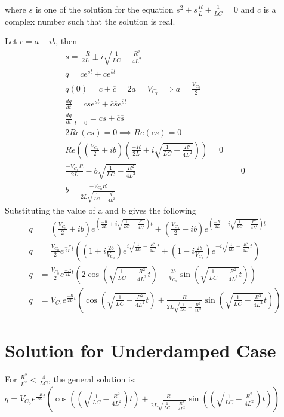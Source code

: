 \documentclass[12pt]{article}
\providecommand{\brak}[1]{\ensuremath{\left(#1\right)}}
\begin{document}
where $s$ is one of the solution for the equation $s^2 + s\frac{R}{L} + \frac{1}{LC} = 0$ and $c$ is a complex number such that the solution is real.\newline

Let $c = a+ib$, then
\begin{align*}
  s = \frac{-R}{2L} \pm i \sqrt{\frac{1}{LC} - \frac{R^2}{4L^2}}\\
  q = c e^{st} + \overline{c} e^{\overline{s}t}\\
  q(0) = c + \overline{c} = 2 a = V_{C_0} \implies a = \frac{V_{C_0}}{2}\\
  \frac{dq}{dt} = cs e^{st} + \overline{c} \overline{s} e^{\overline{s}t}\\
  \frac{dq}{dt}\Bigr|_{t=0} = cs + \overline{c} \overline{s}\\
  2 Re(cs) = 0 \implies Re(cs) = 0 \\
  Re((\frac{V_{C_0}}{2} + ib) ( \frac{-R}{2L} + i \sqrt{\frac{1}{LC} - \frac{R^2}{4L^2}} )) = 0\\
  \frac{-V_{C_0} R}{2L} - b \sqrt{\frac{1}{LC} - \frac{R^2}{4L^2}} &= 0\\
  b = \frac{-V_{C_0} R}{2L \sqrt{\frac{1}{LC} - \frac{R^2}{4L^2}}}
\end{align*}
Substituting the value of a and b gives the following
\begin{align*}
  q &= \brak{ \frac{V_{C_0}}{2} + i b } e^{\brak{ \frac{-R}{2L} + i \sqrt{\frac{1}{LC} - \frac{R^2}{4L^2}} } t} + \brak{ \frac{V_{C_0}}{2} - i b } e^{\brak{ \frac{-R}{2L} - i \sqrt{\frac{1}{LC} - \frac{R^2}{4L^2}} } t} \\
  q &= \frac{V_{C_0}}{2} e^{\frac{-R}{2L}t} \brak{ \brak{ 1 + i \frac{2b}{V_{C_0}} } e^{i \sqrt{\frac{1}{LC} - \frac{R^2}{4L^2}} t} + \brak{ 1 - i \frac{2b}{V_{C_0}} } e^{-i \sqrt{\frac{1}{LC} - \frac{R^2}{4L^2}} t} } \\
  q &= \frac{V_{C_0}}{2} e^{\frac{-R}{2L}t} \brak{ 2 \cos \brak{ \sqrt{\frac{1}{LC} - \frac{R^2}{4L^2}} t } - \frac{2 b}{V_{C_0}} \sin \brak{ \sqrt{\frac{1}{LC} - \frac{R^2}{4L^2}} t } } \\
  q &= V_{C_0} e^{\frac{-R}{2L}t} \brak{ \cos \brak{ \sqrt{\frac{1}{LC} - \frac{R^2}{4L^2}} t } + \frac{R}{2L\sqrt{\frac{1}{LC} - \frac{R^2}{4L^2}}} \sin \brak{\sqrt{\frac{1}{LC} - \frac{R^2}{4L^2}} t } }
\end{align*}


\section{Solution for Underdamped Case}
For $\frac{R^2}{L^2} < \frac{4}{LC}$, the general solution is:\newline
 $q = V_{C_0} e^{\frac{-R}{2L}t} \brak{ \cos \brak{\brak{ \sqrt{\frac{1}{LC} - \frac{R^2}{4L^2}}} t } + \frac{R}{2L\sqrt{\frac{1}{LC} - \frac{R^2}{4L^2}}} \sin \brak{\brak{\sqrt{\frac{1}{LC} - \frac{R^2}{4L^2}}}t } }$
\end{document}
